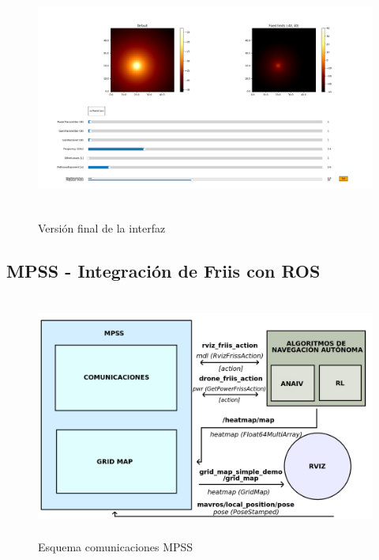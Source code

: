\begin{figure} [t]
    \begin{center}
    \includegraphics[height=8cm]{imagenes/cap4/7_Friss_endGUI.png}
    \end{center}
	\caption[Versión final de la interfaz]{Versión final de la interfaz}
	\label{fig:friis_end_app}
\end{figure}

\subsection{\ac{MPSS} - Integración de Friis con \ac{ROS}}
\label{subsec:friis-ros}

\begin{figure} [t]
    \begin{center}
    \includegraphics[height=8cm]{imagenes/cap4/5_MPSS_esquema.png}
    \end{center}
	\caption[Esquema comunicaciones \ac{MPSS}]{Esquema comunicaciones \ac{MPSS}}
	\label{fig:esquema_mpss}
\end{figure}

